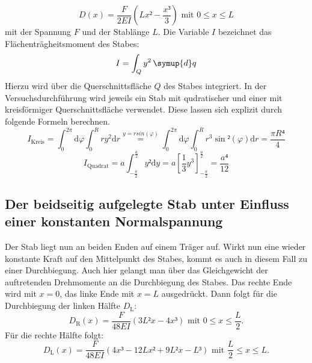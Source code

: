    \begin{equation}
     D(x) = \frac{F}{2EI}\left(Lx² - \frac{x³}{3}\right) \text{ mit }0 \leq x \leq L \label{eq:EinseitigEingespannt}
     \end{equation}
     mit der Spannung $F$ und der Stablänge $L$. Die Variable $I$ bezeichnet das
     Flächenträgheitsmoment des Stabes:
\begin{equation}
  I = \int_{Q}^{}y^2 \, \symup{d}q \label{eq:Flächenträgheitsmoment}
\end{equation}
Hierzu wird über die Querschnittsfläche $Q$ des Stabes integriert.
In der Versuchsdurchführung wird jeweils ein Stab mit qudratischer
 und einer mit kreisförmiger Querschnittsfläche verwendet.
 Diese lassen sich explizit durch folgende Formeln berechnen.
 \begin{equation}
   I_\text{Kreis} = \int_{0}^{2\pi}\text{d}\varphi \int_{0}^{R} ry^2\text{d}r \stackrel{y = rsin(\varphi)}{=}  \int_{0}^{2\pi}\text{d}\varphi \int_{0}^{R} r^3 \sin²(\varphi)\text{d}r = \frac{\pi R⁴}{4} \label{eq:Ir}
   \end{equation}
\begin{equation}
  I_\text{Quadrat} = a \int_{-\frac{a}{2}}^{\frac{a}{2}}y²\text{d}y = a \left[\frac{1}{3}y^3\right]_{-\frac{a}{2}}^{\frac{a}{2}} = \frac{a⁴}{12} \label{eq:Iq}
\end{equation}
\subsection{Der beidseitig aufgelegte Stab unter Einfluss einer konstanten Normalspannung}
Der Stab liegt nun an beiden Enden auf einem Träger auf. Wirkt nun eine wieder
 konstante Kraft auf den Mittelpunkt des Stabes, kommt es auch in diesem Fall
  zu einer Durchbiegung.
 Auch hier gelangt man über das Gleichgewicht der auftretenden Drehmomente an die Durchbiegung des Stabes.
 Das rechte Ende wird mit $ x = 0$, das linke Ende mit $x= L$ ausgedrückt.
    Dann folgt für die Durchbiegung der linken Hälfte $D_\text{L}$:
  \begin{equation}
    D_\text{R}(x) = \frac{F}{48 EI}\left(3L²x-4x³\right) \text{ mit } 0 \leq x \leq \frac{L}{2}\text{.}\label{eq:BeidseitigAufgelegtRechts}
  \end{equation}
Für die rechte Hälfte folgt:
\begin{equation}
  D_\text{L}(x) = \frac{F}{48EI}\left(4x³ -12Lx² +9L²x-L³\right) \text{ mit } \frac{L}{2} \leq x \leq L\text{.}\label{eq:BeidseitigAufgelegtLinks}
\end{equation}
